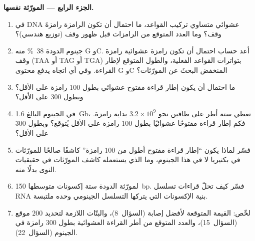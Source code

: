 \begin{problem}
\medskip
\noindent\textbf{الجزء الرابع --- المورّثة نفسها.}
\begin{enumerate}[resume]
  \item في DNA عشوائي متساوي تركيب القواعد، ما
        احتمال أن تكون الرامزة رامزةَ وقف؟ وما العدد
        المتوقع من الرامزات قبل ظهور وقف (توزيع
        هندسي)؟
  \item جينوم الدودة \qty{38}{\%} منه G وC. أعد حساب احتمال
        أن تكون رامزة عشوائية رامزةَ وقف (TAA أو TAG أو TGA) بتواترات
        القواعد الفعلية، والطول المتوقع لإطار القراءة. وفي أي
        اتجاه يدفع محتوى G وC المنخفض البحثَ عن المورّثات؟
  \item ما احتمال أن يكون إطار قراءة مفتوح عشوائي بطول
        $100$ رامزة على الأقل؟ وبطول $300$ على الأقل؟
  \item في الجينوم البالغ \qty{1.6}{Gb}، تعطي ستة أطر على طاقين
        نحو $3.2\times 10^{9}$ بداية رامزة. فكم إطار قراءة مفتوحًا
        عشوائيًا بطول $100$ رامزة على الأقل يُتوقع؟ وبطول
        $300$ على الأقل؟
  \item فسّر لماذا يكون ``إطار قراءة مفتوح أطول من $100$ رامزة''
        كاشفًا صالحًا للمورّثات في بكتيريا لا في هذا الجينوم،
        وما الذي يستعمله كاشف المورّثات في حقيقيات النوى بدلًا منه.
  \item لمورّثة الدودة ستة إكسونات متوسطها \qty{150}{bp}. فسّر
        كيف تحلّ قراءات تسلسل RNA بنية الإكسونات التي يتركها
        التسلسل الجينومي وحده ملتبسة.
  \item لخّص: القيمة المتوقعة لأفضل إصابة (السؤال~8)، والبتّات
        اللازمة لتحديد $200$ موقع (السؤال~15)، والعدد المتوقع
        من أطر القراءة العشوائية بطول $300$ رامزة في الجينوم
        (السؤال~22).
\end{enumerate}
\end{problem}
